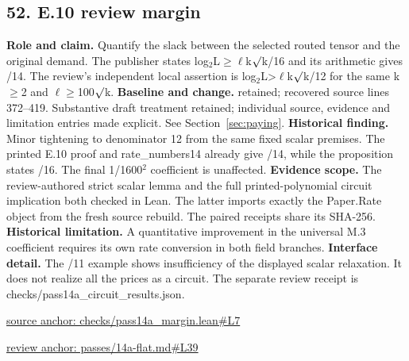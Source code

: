 \documentclass[11pt,letterpaper]{article}
\theoremstyle{definition}\newtheorem{definition}[theorem]{Definition}\newtheorem{example}[theorem]{Example}
\theoremstyle{remark}\newtheorem{remark}[theorem]{Remark}
\begin{document}
\subsection*{52. E.10 review margin}
\textbf{Role and claim.} Quantify the slack between the selected routed tensor and the original demand. The publisher states log\ensuremath{{}_2}L\ensuremath{\ge}\ensuremath{\ell}k\ensuremath{\sqrt{\vphantom{x}}}k/16 and its arithmetic gives /14. The review's independent local assertion is log\ensuremath{{}_2}L>\ensuremath{\ell}k\ensuremath{\sqrt{\vphantom{x}}}k/12 for the same k\ensuremath{\ge}2 and \ensuremath{\ell}\ensuremath{\ge}100\ensuremath{\sqrt{\vphantom{x}}}k.
\textbf{Baseline and change.} retained; recovered source lines 372--419. Substantive draft treatment retained; individual source, evidence and limitation entries made explicit. See Section~\ref{sec:paying}.
\textbf{Historical finding.} Minor tightening to denominator 12 from the same fixed scalar premises. The printed E.10 proof and rate\_numbers14 already give /14, while the proposition states /16. The final 1/1600\ensuremath{{}^2} coefficient is unaffected.
\textbf{Evidence scope.} The review-authored strict scalar lemma and the full printed-polynomial circuit implication both checked in Lean. The latter imports exactly the Paper.Rate object from the fresh source rebuild. The paired receipts share its SHA-256.
\textbf{Historical limitation.} A quantitative improvement in the universal M.3 coefficient requires its own rate conversion in both field branches.
\textbf{Interface detail.} The /11 example shows insufficiency of the displayed scalar relaxation. It does not realize all the prices as a circuit. The separate review receipt is checks/pass14a\_circuit\_results.json.
\par\href{https://github.com/nousentllc/VP-VNP-Review/blob/8a7976933b6b2b4ffda1ad3a0dfb5fc6b6f023e8/checks/pass14a_margin.lean\#L7}{source anchor: checks/pass14a\_margin.lean\#L7}
\par\href{https://github.com/nousentllc/VP-VNP-Review/blob/8a7976933b6b2b4ffda1ad3a0dfb5fc6b6f023e8/passes/14a-flat.md\#L39}{review anchor: passes/14a-flat.md\#L39}
\goodbreak
\end{document}

